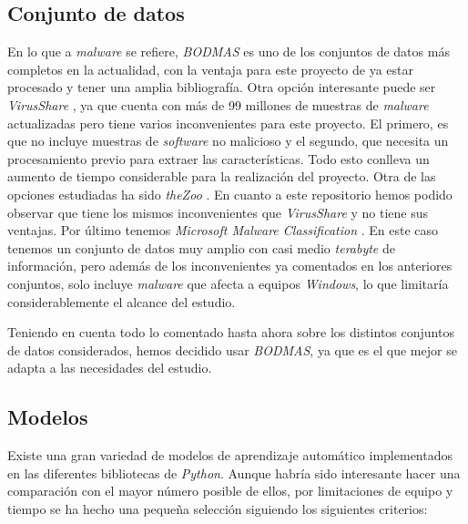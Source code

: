 \subsection{Conjunto de datos}
\label{subsec:select_dataset}

En lo que a \textit{malware} se refiere, \textit{BODMAS} \cite{bodmas} es uno de los conjuntos de datos más completos en la actualidad, con la ventaja para este proyecto de ya estar procesado y tener una amplia bibliografía. Otra opción interesante puede ser \textit{VirusShare} \cite{virusshare}, ya que cuenta con más de 99 millones de muestras de \textit{malware} actualizadas pero tiene varios inconvenientes para este proyecto. El primero, es que no incluye muestras de \textit{software} no malicioso y el segundo, que necesita un procesamiento previo para extraer las características. Todo esto conlleva un aumento de tiempo considerable para la realización del proyecto. Otra de las opciones estudiadas ha sido \textit{theZoo} \cite{thezoo}. En cuanto a este repositorio hemos podido observar que tiene los mismos inconvenientes que \textit{VirusShare} y no tiene sus ventajas. Por último tenemos \textit{Microsoft Malware Classification} \cite{malware-classification}. En este caso tenemos un conjunto de datos muy amplio con casi medio \textit{terabyte} de información, pero además de los inconvenientes ya comentados en los anteriores conjuntos, solo incluye \textit{malware} que afecta a equipos \textit{Windows}, lo que limitaría considerablemente el alcance del estudio.

\vspace{1em}

Teniendo en cuenta todo lo comentado hasta ahora sobre los distintos conjuntos de datos considerados, hemos decidido usar \textit{BODMAS}, ya que es el que mejor se adapta a las necesidades del estudio.

\subsection{Modelos}
\label{subsec:select_model}

Existe una gran variedad de modelos de aprendizaje automático implementados en las diferentes bibliotecas de \textit{Python}. Aunque habría sido interesante hacer una comparación con el mayor número posible de ellos, por limitaciones de equipo y tiempo se ha hecho una pequeña selección siguiendo los siguientes criterios:

